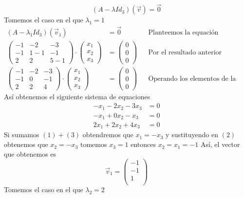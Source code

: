 \documentclass[letterpaper]{article}
\renewcommand{\*}{\cdot}
\theoremstyle{definition}
\begin{document}
$$(A-\lambda Id_{3})(\vec{v})= \vec{0}$$
Tomemos el caso en el que $ \lambda_{1} = 1 $
\begin{align*}
	(A-\lambda_1 Id_{3})(\vec{v}_1)&= \vec{0} && \text{Planteemos la equación}\\
	\begin{pmatrix} -1 & -2 & -3 \\ -1 & 1-1 & -1 \\ 2 & 2 & 5-1 \end{pmatrix} \* \begin{pmatrix}
		x_1\\
		x_2\\
		x_3
	\end{pmatrix}  & = \begin{pmatrix}
	0\\
	0 \\
	0
	\end{pmatrix} && \text{Por el resultado anterior}\\
	\begin{pmatrix} -1 & -2 & -3 \\ -1 & 0 & -1 \\ 2 & 2 & 4 \end{pmatrix} \* \begin{pmatrix}
	x_1\\
	x_2\\
	x_3
	\end{pmatrix}  & = \begin{pmatrix}
	0\\
	0 \\
	0
	\end{pmatrix} && \text{Operando los elementos de la matriz}
\end{align*}
Así obtenemos el siguiente sistema de equaciones
\begin{align}
	-x_1 -2x_2 -3x_3 &= 0 \\
	-x_1 + 0x_2 -x_3 &= 0 \\
	2x_1 +2x_2 +4x_3 &= 0
\end{align}
Si sumamos $ (1) + (3) $ obtendremos que $ x_1 = -x_3 $ y sustituyendo en $ (2) $ obtenemos que $ x_2 = -x_3 $ tomemos $ x_3 = 1 $ entonces $ x_2 = x_1 = -1 $ Así, el vector que obtenemos es \[ \vec{v}_1 = \begin{pmatrix}
	-1\\
	-1\\
	1\\
\end{pmatrix}  \]
Tomemos el caso en el que $ \lambda_{2} = 2 $
\end{document}
